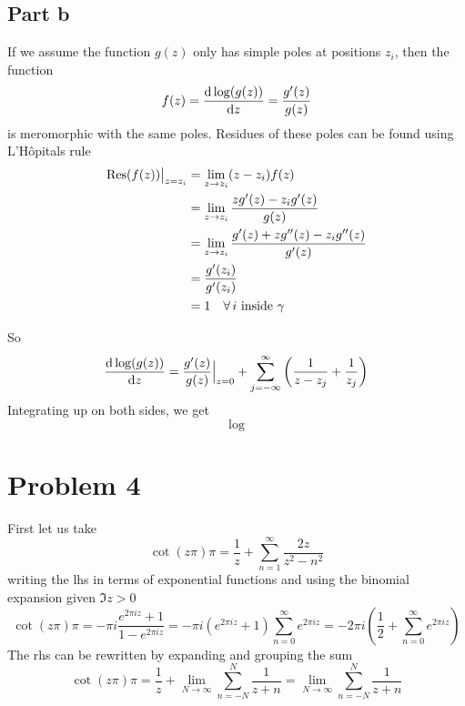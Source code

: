 \documentclass[a4paper,12pt]{article}
\begin{document}
\subsection*{Part b}
If we assume the function $g(z)$ only has simple poles at positions $z_i$, then the function
\begin{equation}
f(z)=\dv{\log(g(z))}{z}=\frac{g'(z)}{g(z)}
\end{equation}
is meromorphic with the same poles. Residues of these poles can be found using L'Hôpitals rule
\begin{equation}
	\begin{aligned}
\Res(f(z))\big|_{z=z_i}&=\lim_{z\to z_i}(z-z_i)f(z)\\
&=\lim_{z\to z_i}\frac{zg'(z)-z_ig'(z)}{g(z)}\\
&=\lim_{z\to z_i}\frac{g'(z)+zg''(z)-z_ig''(z)}{g'(z)}\\
&=\frac{g'(z_i)}{g'(z_i)}\\
&=1~~~\forall \,i \text{ inside $\gamma$ }
	\end{aligned}
\end{equation}

So 
\begin{equation}
\dv{\log(g(z))}{z}=\frac{g'(z)}{g(z)}\Big|_{z=0}+\sum_{j=-\infty}^{\infty }\left(\frac{1}{z-z_j}+\frac{1}{z_j}\right)
\end{equation}
Integrating up on both sides, we get
\begin{equation}
\log 
\end{equation}
\section*{Problem 4}
First let us take
\begin{equation}
\cot(z\pi)\pi=\frac{1}{z}+\sum_{n=1}^{\infty}\frac{2z}{z^2-n^2}
\end{equation}
writing the lhs in terms of exponential functions and using the binomial expansion given $\Im z>0$
\begin{equation}
	\cot(z\pi)\pi=-\pi i\frac{e^{2\pi iz}+1}{1-e^{2\pi iz}}=-\pi i\left(e^{2\pi iz}+1\right)\sum_{n=0}^{\infty}e^{2\pi iz}=-2\pi i\left(\frac{1}{2}+\sum_{n=0}^{\infty}e^{2\pi iz}\right)
\end{equation}
The rhs can be rewritten by expanding and grouping the sum
\begin{equation}
	\cot(z\pi)\pi=\frac{1}{z}+\lim_{N\to\infty}\sum_{n=-N}^{N}\frac{1}{z+n}=\lim_{N\to\infty}\sum_{n=-N}^{N}\frac{1}{z+n}
\end{equation}
\end{document}

